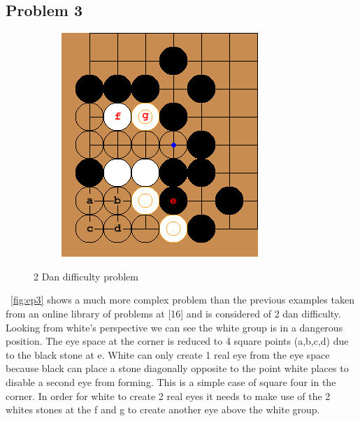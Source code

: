 \documentclass{l4proj}
\begin{document}
\subsection{Problem 3}

\begin{figure}[!ht]
\centering
\begin{subfigure}[b]{0.45\textwidth}
\includegraphics[width=\textwidth]{ep3/1.png}
\end{subfigure}
\caption{2 Dan difficulty problem}
\label{fig:ep3}
\end{figure}

~\autoref{fig:ep3} shows a much more complex problem than the previous examples taken from an online library of problems at [16] and is considered of 2 dan difficulty. Looking from white’s perspective we can see the white group is in a dangerous position. The eye space at the corner is reduced to 4 square points (a,b,c,d) due to the black stone at e. White can only create 1 real eye from the eye space because black can place a stone diagonally opposite to the point white places to disable a second eye from forming. This is a simple case of square four in the corner. In order for white to create 2 real eyes it needs to make use of the 2 whites stones at the f and g to create another eye above the white group.
\end{document}
